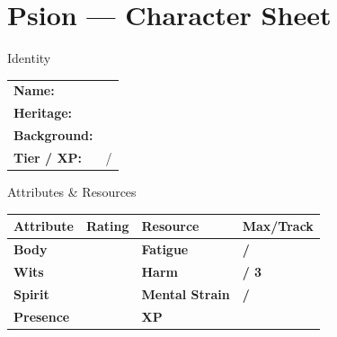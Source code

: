 \documentclass[10pt]{article}
\begin{document}
\newpage

\section*{Psion --- Character Sheet}

\begin{minipage}[t]{0.48\linewidth}
    \begin{charbox}{Identity}
        \begin{tabular}{p{2.5cm} p{5cm}}
            \textbf{Name:} & \underline{\hspace{4cm}} \\
            \textbf{Heritage:} & \underline{\hspace{4cm}} \\
            \textbf{Background:} & \underline{\hspace{4cm}} \\
            \textbf{Tier / XP:} & \underline{\hspace{2cm}} / \underline{\hspace{2cm}} \\
        \end{tabular}
    \end{charbox}
    
    \vspace{0.5em}
    
    \begin{charbox}{Attributes \& Resources}
        \begin{tabular}{>{\bfseries}p{2.5cm} >{\bfseries}p{1.5cm} >{\bfseries}p{2.5cm} >{\bfseries}p{1.5cm}}
            \toprule
            \textbf{Attribute} & \textbf{Rating} & \textbf{Resource} & \textbf{Max/Track} \\
            \midrule
            Body & \underline{\hspace{1.5cm}} & Fatigue & \underline{\hspace{1.5cm}} / \underline{\hspace{1.5cm}} \\
            Wits & \underline{\hspace{1.5cm}} & Harm & \underline{\hspace{1.5cm}} / 3 \\
            Spirit & \underline{\hspace{1.5cm}} & Mental Strain & \underline{\hspace{1.5cm}} / \underline{\hspace{1.5cm}} \\
            Presence & \underline{\hspace{1.5cm}} & XP & \underline{\hspace{1.5cm}} \\
            \bottomrule
        \end{tabular}
    \end{charbox}
    

\end{minipage}
\end{document}
